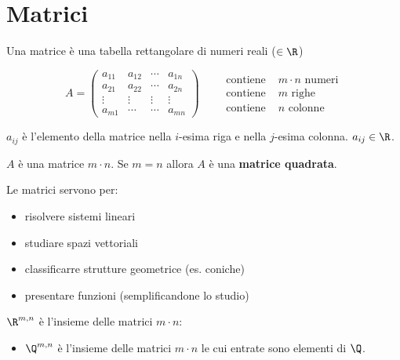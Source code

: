 
\section{Matrici}

Una matrice è una tabella rettangolare di numeri reali ($\in\R$)

\[
A=\begin{pmatrix}
a_{1 1} & a_{1 2} & \cdots & a_{1 n} \\
a_{2 1} & a_{2 2} & \cdots & a_{2 n}\\
\vdots & \vdots & \vdots & \vdots \\
a_{m 1} & \cdots & \cdots & a_{m n}
\end{pmatrix}\qquad \begin{aligned}
\text{contiene } &m\cdot n \text{ numeri}\\
\text{contiene } &m \text{ righe}\\
\text{contiene } &n \text{ colonne}
\end{aligned}
\]

$a_{ij}$ è l'elemento della matrice nella $i$-esima riga e nella $j$-esima colonna. $a_{ij}\in\R$.

$A$ è una matrice $m\cdot n$. Se $m=n$ allora $A$ è una \textbf{matrice quadrata}.

Le matrici servono per:
\begin{itemize}
\item risolvere sistemi lineari
\item studiare spazi vettoriali
\item classificarre strutture geometrice (es. coniche)
\item presentare funzioni (semplificandone lo studio)
\end{itemize}

$\R^{m,n}$ è l'insieme delle matrici $m\cdot n$:
\begin{itemize}
\item $\Q^{m, n}$ è l'insieme delle matrici $m\cdot n$ le cui entrate sono elementi di $\Q$.
\end{itemize}

